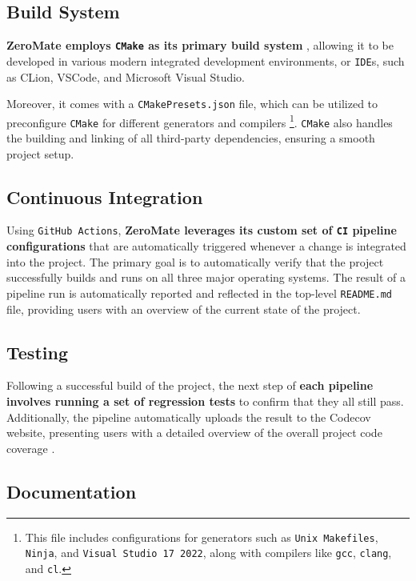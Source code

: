 \documentclass[english, ing, kiv, he, iso690numb, pdf]{fasthesis}
\begin{document}
	\subsection{Build System}
	
	\textbf{ZeroMate employs \texttt{CMake} as its primary build system} \cite{CMake}, allowing it to be developed in various modern integrated development environments, or \texttt{IDE}s, such as CLion, VSCode, and Microsoft Visual Studio.
	
	Moreover, it comes with a \texttt{CMakePresets.json} file, which can be utilized to preconfigure \texttt{CMake} for different generators and compilers \footnote{This file includes configurations for generators such as \texttt{Unix Makefiles}, \texttt{Ninja}, and \texttt{Visual Studio 17 2022}, along with compilers like \texttt{gcc}, \texttt{clang}, and \texttt{cl}.}. \texttt{CMake} also handles the building and linking of all third-party dependencies, ensuring a smooth project setup.
	
	\subsection{Continuous Integration} \label{section-Continuous-Integration}
	
	Using \texttt{GitHub Actions}, \textbf{ZeroMate leverages its custom set of \texttt{CI} pipeline configurations} that are automatically triggered whenever a change is integrated into the project. The primary goal is to automatically verify that the project successfully builds and runs on all three major operating systems. The result of a pipeline run is automatically reported and reflected in the top-level \texttt{README.md} file, providing users with an overview of the current state of the project.
	
	\subsection{Testing}
	
	Following a successful build of the project, the next step of \textbf{each pipeline involves running a set of regression tests} to confirm that they all still pass. Additionally, the pipeline automatically uploads the result to the Codecov website, presenting users with a detailed overview of the overall project code coverage \cite{Codecov}.
	
	\subsection{Documentation}
	
\end{document}
